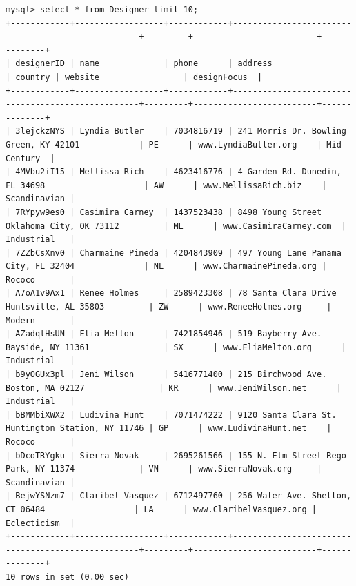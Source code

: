 \documentclass[american,extrafontsizes,12pt,portrait,letterpaper,oneside,onecolumn,final]{memoir}
\begin{document}
\begin{verbatim}
mysql> select * from Designer limit 10;
+------------+------------------+------------+---------------------------------------------------+---------+-------------------------+--------------+
| designerID | name_            | phone      | address                                           | country | website                 | designFocus  |
+------------+------------------+------------+---------------------------------------------------+---------+-------------------------+--------------+
| 3lejckzNYS | Lyndia Butler    | 7034816719 | 241 Morris Dr. Bowling Green, KY 42101            | PE      | www.LyndiaButler.org    | Mid-Century  |
| 4MVbu2iI15 | Mellissa Rich    | 4623416776 | 4 Garden Rd. Dunedin, FL 34698                    | AW      | www.MellissaRich.biz    | Scandinavian |
| 7RYpyw9es0 | Casimira Carney  | 1437523438 | 8498 Young Street Oklahoma City, OK 73112         | ML      | www.CasimiraCarney.com  | Industrial   |
| 7ZZbCsXnv0 | Charmaine Pineda | 4204843909 | 497 Young Lane Panama City, FL 32404              | NL      | www.CharmainePineda.org | Rococo       |
| A7oA1v9Ax1 | Renee Holmes     | 2589423308 | 78 Santa Clara Drive Huntsville, AL 35803         | ZW      | www.ReneeHolmes.org     | Modern       |
| AZadqlHsUN | Elia Melton      | 7421854946 | 519 Bayberry Ave. Bayside, NY 11361               | SX      | www.EliaMelton.org      | Industrial   |
| b9yOGUx3pl | Jeni Wilson      | 5416771400 | 215 Birchwood Ave. Boston, MA 02127               | KR      | www.JeniWilson.net      | Industrial   |
| bBMMbiXWX2 | Ludivina Hunt    | 7071474222 | 9120 Santa Clara St. Huntington Station, NY 11746 | GP      | www.LudivinaHunt.net    | Rococo       |
| bDcoTRYgku | Sierra Novak     | 2695261566 | 155 N. Elm Street Rego Park, NY 11374             | VN      | www.SierraNovak.org     | Scandinavian |
| BejwYSNzm7 | Claribel Vasquez | 6712497760 | 256 Water Ave. Shelton, CT 06484                  | LA      | www.ClaribelVasquez.org | Eclecticism  |
+------------+------------------+------------+---------------------------------------------------+---------+-------------------------+--------------+
10 rows in set (0.00 sec)


\end{verbatim}
\end{document}
